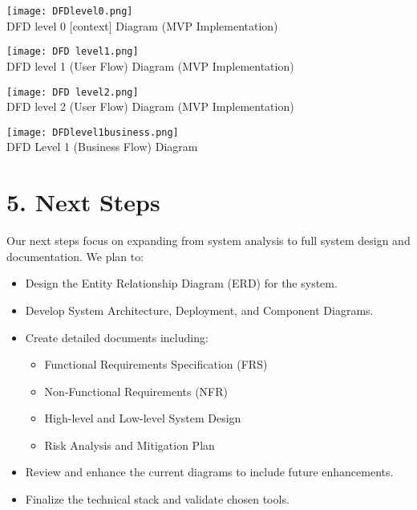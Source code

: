 \documentclass[12pt,a4paper]{article}
\begin{document}
\begin{center}
      \texttt{[image: DFDlevel0.png]}
    \\ DFD level 0 [context] Diagram (MVP Implementation)
\end{center}

\begin{center}
    \texttt{[image: DFD level1.png]}
    \\ DFD level 1 (User Flow) Diagram (MVP Implementation)
\end{center}

\begin{center}
    \texttt{[image: DFD level2.png]}
    \\ DFD level 2 (User Flow) Diagram (MVP Implementation)
\end{center}
\begin{center}
    \texttt{[image: DFDlevel1business.png]}
    \\ DFD Level 1 (Business Flow) Diagram
\end{center}
\section*{5. Next Steps}
Our next steps focus on expanding from system analysis to full system design and documentation.  
We plan to:
\begin{itemize}
    \item Design the Entity Relationship Diagram (ERD) for the system.
    \item Develop System Architecture, Deployment, and Component Diagrams.
    \item Create detailed documents including:
        \begin{itemize}
            \item Functional Requirements Specification (FRS)
            \item Non-Functional Requirements (NFR)
            \item High-level and Low-level System Design
            \item Risk Analysis and Mitigation Plan
        \end{itemize}
    \item Review and enhance the current diagrams to include future enhancements.
    \item Finalize the technical stack and validate chosen tools.
\end{itemize}
\end{document}
